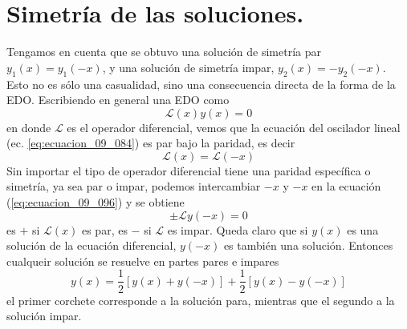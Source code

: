\section*{Simetría de las soluciones.}
Tengamos en cuenta que se obtuvo una solución de simetría par $y_{1}(x) = y_{1} (-x)$, y una solución de simetría impar, $y_{2}(x) = - y_{2}(-x)$. Esto no es sólo una casualidad, sino una consecuencia directa de la forma de la EDO. Escribiendo en general una EDO como
\begin{equation}
\mathcal{L}(x) y(x) = 0
\label{eq:ecuacion_09_096}
\end{equation}
en donde $\mathcal{L}$ es el operador diferencial, vemos que la ecuación del oscilador lineal (ec. \ref{eq:ecuacion_09_084}) es par bajo la paridad, es decir
\begin{equation}
\mathcal{L}(x) = \mathcal{L}(-x)
\label{eq:ecuacion_09_097}
\end{equation}
Sin importar el tipo de operador diferencial tiene una paridad específica o simetría, ya sea par o impar, podemos intercambiar $-x$ y $-x$ en la ecuación (\ref{eq:ecuacion_09_096}) y se obtiene
\begin{equation}
\pm \mathcal{L} y(-x) = 0
\label{eq:ecuacion_09_098}
\end{equation}
es $+$ si $\mathcal{L}(x)$ es par, es $-$ si $\mathcal{L}$ es impar. Queda claro que si $y(x)$ es una solución de la ecuación diferencial, $y(-x)$ es también una solución. Entonces cualqueir solución se resuelve en partes pares e impares
\begin{equation}
y(x) = \dfrac{1}{2} \left[ y(x) + y(-x) \right] + \dfrac{1}{2} \left[ y(x) - y (-x) \right]
\label{eq:ecuacion_09_099}
\end{equation}
el primer corchete corresponde a la solución para, mientras que el segundo a la solución impar.
